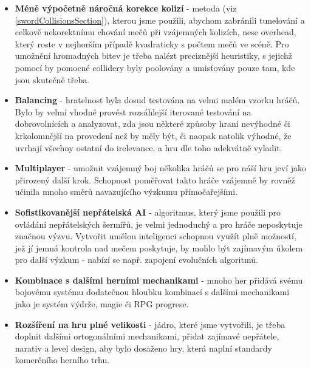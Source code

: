 \begin{itemize}
    \item \textbf{Méně výpočetně náročná korekce kolizí} - metoda (viz \ref{swordCollisionsSection}), kterou jsme použili, abychom zabránili tunelování a celkově nekorektnímu chování mečů při vzájemných kolizích, nese overhead, který roste v nejhorším případě kvadraticky s počtem mečů ve scéně. Pro umožnění hromadných bitev je třeba nalézt preciznější heuristiky, s jejichž pomocí by pomocné collidery byly poolovány a umisťovány pouze tam, kde jsou skutečně třeba.
    \item \textbf{Balancing} - hratelnost byla dosud testována na velmi malém vzorku hráčů. Bylo by velmi vhodné provést rozsáhlejší iterované testování na dobrovolnících a analyzovat, zda jsou některé způsoby hraní nevýhodné či krkolomnější na provedení než by měly být, či naopak natolik výhodné, že uvrhají všechny ostatní do irelevance, a hru dle toho adekvátně vyladit.
    \item \textbf{Multiplayer} - umožnit vzájemný boj několika hráčů se pro náší hru jeví jako přirozený další krok. Schopnost poměřovat takto hráče vzájemně by rovněž učinila mnoho směrů navazujícího výzkumu přímočařejšími.
    \item \textbf{Sofistikovanější nepřátelská AI} - algoritmus, který jsme použili pro ovládání nepřátelských šermířů, je velmi jednoduchý a pro hráče neposkytuje značnou výzvu. Vytvořit umělou inteligenci schopnou využít plně možností, jež jí jemná kontrola nad mečem poskytuje, by mohlo být zajímavým úkolem pro další výzkum - nabízí se např. zapojení evolučních algoritmů.
    \item \textbf{Kombinace s dalšími herními mechanikami} - mnoho her přidává svému bojovému systému dodatečnou hloubku kombinací s dalšími mechanikami jako je systém výdrže, magie či \acs{RPG} progrese.
    \item \textbf{Rozšíření na hru plné velikosti} - jádro, které jsme vytvořili, je třeba doplnit dalšími ortogonálními mechanikami, přidat zajímavé nepřátele, narativ a level design, aby bylo dosaženo hry, která naplní standardy komerčního herního trhu. 
\end{itemize}

\nocite{ThisGithubRepo}